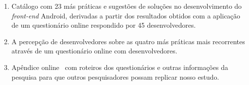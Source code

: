 \begin{enumerate}

	\item Catálogo com 23 más práticas e sugestões de soluções no desenvolvimento do \textit{front-end} Android, derivadas a partir dos resultados obtidos com a aplicação de um questionário online respondido por 45 desenvolvedores.

	\item A percepção de desenvolvedores sobre as quatro más práticas mais recorrentes através de um questionário online com  desenvolvedores.

	\item Apêndice online~\cite{apendice} com roteiros dos questionários e outras informações da pesquisa para que outros pesquisadores possam replicar nosso estudo.

\end{enumerate}


